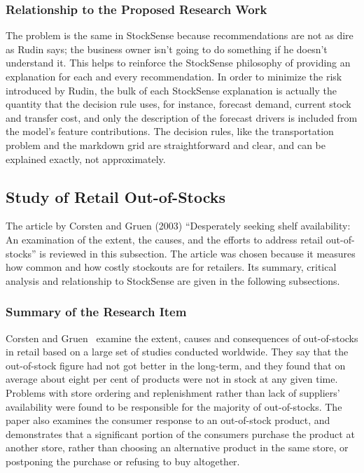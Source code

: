 \documentclass{StockSense}
\begin{document}
\subsubsection{Relationship to the Proposed Research Work}

The problem is the same in StockSense because recommendations are not as dire as Rudin says; the business owner isn't going to do something if he doesn't understand it. This helps to reinforce the StockSense philosophy of providing an explanation for each and every recommendation. In order to minimize the risk introduced by Rudin, the bulk of each StockSense explanation is actually the quantity that the decision rule uses, for instance, forecast demand, current stock and transfer cost, and only the description of the forecast drivers is included from the model's feature contributions. The decision rules, like the transportation problem and the markdown grid are straightforward and clear, and can be explained exactly, not approximately.

\subsection{Study of Retail Out-of-Stocks}

The article by Corsten and Gruen (2003) ``Desperately seeking shelf availability: An examination of the extent, the causes, and the efforts to address retail out-of-stocks'' is reviewed in this subsection. The article was chosen because it measures how common and how costly stockouts are for retailers. Its summary, critical analysis and relationship to StockSense are given in the following subsections.

\subsubsection{Summary of the Research Item}

Corsten and Gruen~\cite{corsten2003desperately} examine the extent, causes and consequences of out-of-stocks in retail based on a large set of studies conducted worldwide. They say that the out-of-stock figure had not got better in the long-term, and they found that on average about eight per cent of products were not in stock at any given time. Problems with store ordering and replenishment rather than lack of suppliers' availability were found to be responsible for the majority of out-of-stocks. The paper also examines the consumer response to an out-of-stock product, and demonstrates that a significant portion of the consumers purchase the product at another store, rather than choosing an alternative product in the same store, or postponing the purchase or refusing to buy altogether.
\end{document}
